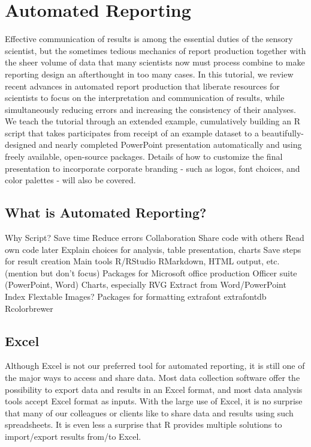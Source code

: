 \documentclass[
]{book}
\begin{document}
\hypertarget{auto-report}{%
\chapter{Automated Reporting}\label{auto-report}}

Effective communication of results is among the essential duties of the sensory scientist, but the sometimes tedious mechanics of report production together with the sheer volume of data that many scientists now must process combine to make reporting design an afterthought in too many cases. In this tutorial, we review recent advances in automated report production that liberate resources for scientists to focus on the interpretation and communication of results, while simultaneously reducing errors and increasing the consistency of their analyses. We teach the tutorial through an extended example, cumulatively building an R script that takes participates from receipt of an example dataset to a beautifully-designed and nearly completed PowerPoint presentation automatically and using freely available, open-source packages. Details of how to customize the final presentation to incorporate corporate branding - such as logos, font choices, and color palettes - will also be covered.

\hypertarget{what-is-automated-reporting}{%
\section{What is Automated Reporting?}\label{what-is-automated-reporting}}

Why Script?
Save time
Reduce errors
Collaboration
Share code with others
Read own code later
Explain choices for analysis, table presentation, charts
Save steps for result creation
Main tools
R/RStudio
RMarkdown, HTML output, etc. (mention but don't focus)
Packages for Microsoft office production
Officer suite (PowerPoint, Word)
Charts, especially RVG
Extract from Word/PowerPoint
Index
Flextable
Images?
Packages for formatting
extrafont
extrafontdb
Rcolorbrewer

\hypertarget{excel}{%
\section{Excel}\label{excel}}

Although Excel is not our preferred tool for automated reporting, it is still one of the major ways to access and share data. Most data collection software offer the possibility to export data and results in an Excel format, and most data analysis tools accept Excel format as inputs. With the large use of Excel, it is no surprise that many of our colleagues or clients like to share data and results using such spreadsheets. It is even less a surprise that R provides multiple solutions to import/export results from/to Excel.
\end{document}
